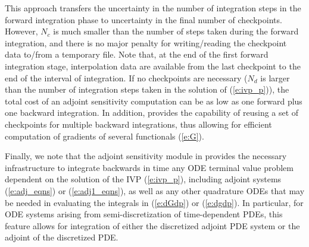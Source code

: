 This approach transfers the uncertainty in the number of integration
steps in the forward integration phase to uncertainty in the final
number of checkpoints.  However, $N_c$ is much smaller than the number
of steps taken during the forward integration, and there is no major
penalty for writing/reading the checkpoint data to/from a temporary
file.
%
Note that, at the end of the first forward integration stage, interpolation
data are available from the last checkpoint to the end of the interval
of integration.  If no checkpoints are necessary ($N_d$ is larger than the 
number of integration steps taken in the solution of (\ref{e:ivp_p})),
the total cost of an adjoint sensitivity computation can be as low as one forward
plus one backward integration.
%
In addition, {\cvodes} provides the capability of reusing a set of checkpoints
for multiple backward integrations, thus allowing for efficient computation of
gradients of several functionals (\ref{e:G}).

\bigskip

Finally, we note that the adjoint sensitivity module in {\cvodes} provides the
necessary infrastructure to integrate backwards in time any ODE terminal value
problem dependent on the solution of the IVP (\ref{e:ivp_p}), including
adjoint systems (\ref{e:adj_eqns}) or (\ref{e:adj1_eqns}), as well as any other
quadrature ODEs that may be needed in evaluating the integrals in (\ref{e:dGdp}) 
or (\ref{e:dgdp}). In particular, for ODE systems arising from semi-discretization
of time-dependent PDEs, this feature allows for integration of either the 
discretized adjoint PDE system or the adjoint of the discretized PDE.

